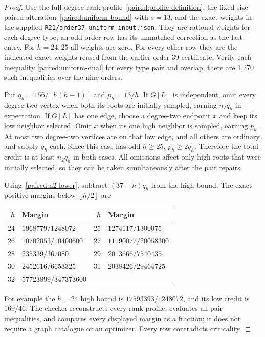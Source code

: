 \documentclass[11pt,a4paper]{article}
\theoremstyle{definition}\newtheorem{definition}[theorem]{Definition}
\theoremstyle{remark}\newtheorem{remark}[theorem]{Remark}
\newcommand{\floor}[1]{\left\lfloor#1\right\rfloor}
\begin{document}
\begin{proof}
Use the full-degree rank profile~\eqref{paired:profile-definition},
the fixed-size paired alteration~\eqref{paired:uniform-bound} with
$s=13$, and the exact weights in the supplied
\nolinkurl{R21/order37_uniform_input.json}. They are rational weights
for each degree type; an odd-order row has its unmatched correction
as the last entry. For $h=24,25$ all weights are zero. For every
other row they are the indicated exact weights reused from the
earlier order-39 certificate. Verify each inequality
\eqref{paired:uniform-dual} for every type pair and overlap; there
are 1,270 such inequalities over the nine orders.

Put $q_h=156/[h(h-1)]$ and $p_h=13/h$. If $G[L]$ is independent,
omit every degree-two vertex when both its roots are initially
sampled, earning $n_2q_h$ in expectation. If $G[L]$ has one edge,
choose a degree-two endpoint $x$ and keep its low neighbor selected.
Omit $x$ when its one high neighbor is sampled, earning $p_h$.
At most two degree-two vertices are on that low edge, and all
others are ordinary and supply $q_h$ each. Since this case has
odd $h\ge25$, $p_h\ge2q_h$. Therefore the total credit is at least
$n_2q_h$ in both cases. All omissions affect only high roots that
were initially selected, so they can be taken simultaneously after
the pair repairs.

Using~\eqref{paired:n2-lower}, subtract $(37-h)q_h$ from the high
bound. The exact positive margins below $\floor{h/2}$ are
\begin{center}\small
\begin{tabular}{rl@{\qquad}rl}
\toprule
$h$&Margin&$h$&Margin\\\midrule
24&$1968779/1248072$&25&$1274117/1300075$\\
26&$10702053/10400600$&27&$11190077/20058300$\\
28&$235339/367080$&29&$2013666/7540435$\\
30&$2452616/6653325$&31&$2038426/29464725$\\
32&$57723899/347373600$&&\\\bottomrule
\end{tabular}
\end{center}
For example the $h=24$ high bound is $17593393/1248072$, and its
low credit is $169/46$. The checker reconstructs every rank profile,
evaluates all pair inequalities, and compares every displayed margin
as a fraction; it does not require a graph catalogue or an optimizer.
Every row contradicts criticality.
\end{proof}
\end{document}
